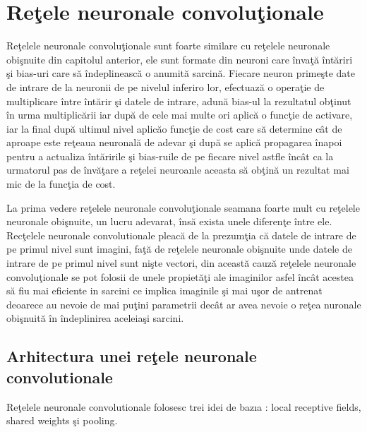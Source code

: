 \chapter{Re\c{t}ele neuronale convolu\c{t}ionale}

Re\c{t}elele neuronale convolu\c{t}ionale  sunt foarte similare cu re\c{t}elele neuronale obi\c{s}nuite din capitolul anterior, ele sunt formate din neuroni care \^{i}nva\c{t}\u{a} \^{i}nt\u{a}riri \c{s}i bias-uri care s\u{a} \^{i}ndeplineasc\u{a} o anumit\u{a} sarcin\u{a}. Fiecare neuron prime\c{s}te date de intrare de la neuronii de pe nivelul inferiro lor, efectuaz\u{a} o opera\c{t}ie de multiplicare \^{i}ntre \^{i}nt\u{a}rir \c{s}i datele de intrare, adun\u{a} bias-ul la rezultatul ob\c{t}inut \^{i}n urma multiplic\u{a}rii iar dup\u{a} de cele mai multe ori aplic\u{a} o func\c{t}ie de activare, iar la final dup\u{a} ultimul nivel aplic\u{a}o func\c{t}ie de cost care s\u{a} determine c\^{a}t de aproape este re\c{t}eaua neuronal\u{a} de adevar \c{s}i dup\u{a} se aplic\u{a} propagarea \^{i}napoi pentru a actualiza \^{i}nt\u{a}ririle \c{s}i bias-ruile de pe fiecare nivel astfle \^{i}nc\^{a}t ca la urmatorul pas de \^{i}nv\u{a}\c{t}are a re\c{t}elei neuroanle aceasta s\u{a} ob\c{t}in\u{a} un rezultat mai mic de la func\c{t}ia de cost.

La prima vedere re\c{t}elele neuronale convolu\c{t}ionale seamana foarte mult cu re\c{t}elele neuronale obi\c{s}nuite, un lucru adevarat, \^{i}ns\u{a} exista unele diferen\c{t}e \^{i}ntre ele. Rec\c{t}elele neuronale convolutionale pleac\u{a} de la prezum\c{t}ia c\u{a} datele de intrare de pe primul nivel sunt imagini, fa\c{t}\u{a} de re\c{t}elele neuronale obi\c{s}nuite unde datele de intrare de pe primul nivel sunt ni\c{s}te vectori, din aceast\u{a} cauz\u{a} re\c{t}elele neuronale convolu\c{t}ionale se pot folosii de unele propiet\u{a}\c{t}i ale imaginilor asfel \^{i}nc\^{a}t acestea s\u{a} fiu mai eficiente in sarcini ce implica imaginile \c{s}i mai u\c{s}or de antrenat deoarece au nevoie de mai pu\c{t}ini parametrii dec\^{a}t ar avea nevoie o re\c{t}ea nuronale obi\c{s}nuit\u{a} \^{i}n \^{i}ndeplinirea aceleia\c{s}i sarcini.

\section{Arhitectura unei re\c{t}ele neuronale convolutionale}

Re\c{t}elele neuronale convolutionale folosesc trei idei de baz\i{a} : local receptive fields, shared weights \c{s}i pooling.

